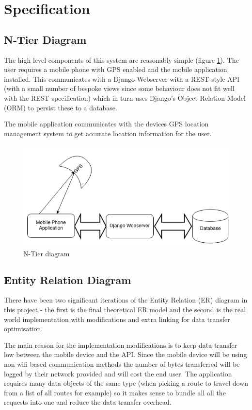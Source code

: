 \section{Specification}
\subsection{N-Tier Diagram}
The high level components of this system are reasonably simple (figure
\ref{NTier}). The
user requires a mobile phone with GPS enabled and the mobile
application installed. This communicates with a Django Webserver with a
REST-style API (with a small number of bespoke views since some
behaviour does not fit well with the REST specification) which in turn
uses Django's Object Relation Model (ORM) to persist these to a
database.

The mobile application communicates with the devices GPS location
management system to get accurate location information for the
user.
\begin{figure}[h]
  \centering
  \includegraphics[width=\linewidth]{images/N-tier.png}
  \caption{N-Tier diagram}
  \label{NTier}
\end{figure}

\subsection{Entity Relation Diagram}
\label{sec:ER}
There have been two significant iterations of the Entity Relation (ER)
diagram in this project - the first is the final theoretical ER model
and the second is the real world implementation with modifications and
extra linking for data transfer optimisation. 

The main reason for the implementation modifications is to keep data
transfer low between the mobile device and the API. Since the mobile
device will be using non-wifi based communication methods the number
of bytes transferred will be logged by their network provided and will
cost the end user. The application requires many data objects of the
same type (when picking a route to travel down from a list of all
routes for example) so it makes sense to bundle all all the requests
into one and reduce the data transfer overhead. 

